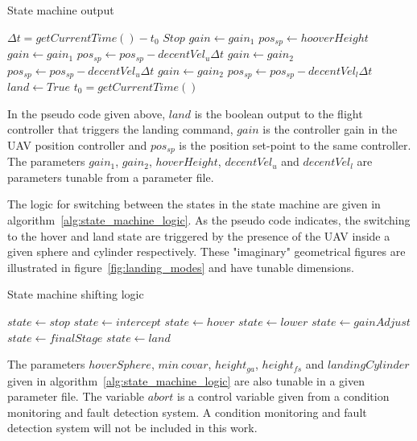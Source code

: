 \begin{algorithm}
\caption{State machine output}\label{alg:state_machine_output}
	\begin{algorithmic}[1]
		\State $\Delta t=getCurrentTime()-t_0$
			\State $Stop$
			\State $gain \gets gain_{1}$
			\State $pos_{sp} \gets hooverHeight$
			\State $gain \gets gain_{1}$
			\State $pos_{sp} \gets pos_{sp}-decentVel_u \Delta t$
			\State $gain \gets gain_{2}$
			\State $pos_{sp} \gets pos_{sp}-decentVel_u \Delta t$
			\State $gain \gets gain_{2}$
			\State $pos_{sp} \gets pos_{sp}-decentVel_l \Delta t$
			\State $land \gets True$
		\EndIf{}
		\State $t_0=getCurrentTime()$
	\end{algorithmic}
\end{algorithm}
In the pseudo code given above, $land$ is the boolean output to the flight controller that triggers the landing command, $gain$ is the controller gain in the UAV position controller and $pos_{sp}$ is the position set-point to the same controller. The parameters $gain_1$, $gain_2$, $hoverHeight$, $decentVel_u$ and $decentVel_l$ are parameters tunable from a parameter file. 

The logic for switching between the states in the state machine are given in algorithm~\ref{alg:state_machine_logic}. As the pseudo code indicates, the switching to the hover and land state are triggered by the presence of the UAV inside a given sphere and cylinder respectively. These "imaginary" geometrical figures are illustrated in figure~\ref{fig:landing_modes} and have tunable dimensions.

\begin{algorithm}
\caption{State machine shifting logic}\label{alg:state_machine_logic}
	\begin{algorithmic}[1]
			\State $state \gets stop$
			\State $state \gets intercept$
				\State $state \gets hover$
			\EndIf
				\State $state \gets lower$
			\EndIf
				\State $state \gets gainAdjust$
			\EndIf
				\State $state \gets finalStage$
			\EndIf
				\State $state \gets land$
			\EndIf
		\EndIf
	\end{algorithmic}
\end{algorithm}
The parameters $hoverSphere$, $min \: covar$, $height_{ga}$, $height_{fs}$ and $landingCylinder$ given in algorithm~\ref{alg:state_machine_logic} are also tunable in a given parameter file. The variable $abort$ is a control variable given from a condition monitoring and fault detection system. A condition monitoring and fault detection system will not be included in this work.

